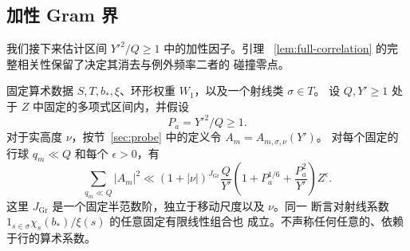 \subsection{加性 Gram 界}

我们接下来估计区间 $Y'^2/Q\ge1$ 中的加性因子。引理
~\ref{lem:full-correlation} 的完整相关性保留了决定其消去与例外频率二者的
碰撞零点。

\begin{proposition}\label{prop:probe-gram}
固定算术数据 $S,T,b_*,\xi$、环形权重 $W_1$，以及一个射线类 $\sigma\in T$。
设 $Q,Y'\ge1$ 处于 $Z$ 中固定的多项式区间内，并假设
\[
 P_a=Y'^2/Q\ge1.
\]
对于实高度 $\nu$，按节~\ref{sec:probe} 中的定义令 $A_m=A_{m,\sigma,\nu}(Y')$。
对每个固定的行球 $q_m\ll Q$ 和每个 $\epsilon>0$，有
\begin{equation}
 \sum_{q_m\ll Q}|A_m|^2
 \ll (1+|\nu|)^{J_{\mathrm{Gr}}}\frac Q{Y'}
       \left(1+P_a^{1/6}+\frac{P_a^2}{Y'}\right)Z^\epsilon.
 \label{eq:gram-quantitative}
\end{equation}
这里 $J_{\mathrm{Gr}}$ 是一个固定半范数阶，独立于移动尺度以及 $\nu$。同一
断言对射线系数 $1_{s\in\sigma}\chi_s(b_*)/\xi(s)$ 的任意固定有限线性组合也
成立。不声称任何任意的、依赖于行的算术系数。
\end{proposition}
